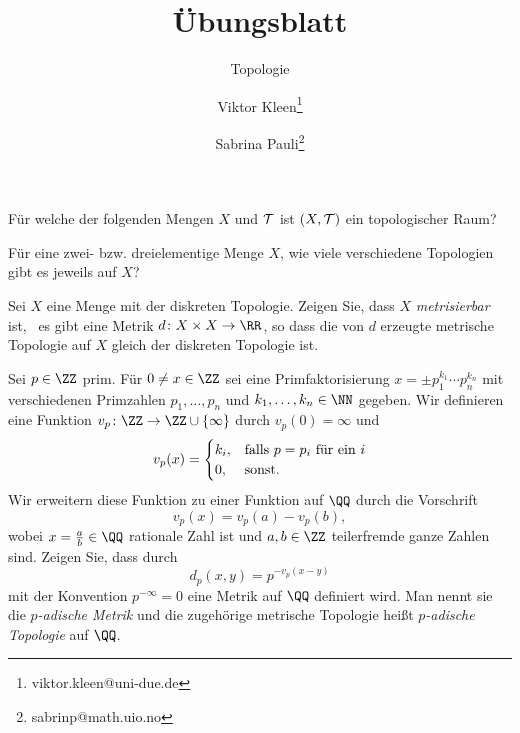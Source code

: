 

\setcounter{Sheet}{1}

\title{Übungsblatt \theSheet}
\subtitle{Topologie}
\author{Viktor Kleen\footnote{viktor.kleen@uni-due.de} \and Sabrina Pauli\footnote{sabrinp@math.uio.no}}
\date{}


\maketitle
\begin{exercise}
Für welche der folgenden Mengen \(X\) und \(\cal T\) ist \((X,\cal T)\)
ein topologischer Raum?
\end{exercise}

\begin{exercise}
Für eine zwei- bzw. dreielementige Menge \(X\), wie viele verschiedene
Topologien gibt es jeweils auf \(X\)?
\end{exercise}

\begin{exercise}
Sei \(X\) eine Menge mit der diskreten Topologie. Zeigen Sie, dass \(X\)
\emph{metrisierbar} ist, \ddh~es gibt eine Metrik \(d\colon X\times
X\to\RR\), so dass die von \(d\) erzeugte metrische Topologie auf \(X\)
gleich der diskreten Topologie ist.
\end{exercise}

\begin{exercise}
Sei \(p\in \ZZ\) prim. Für \(0\neq x\in\ZZ\) sei eine Primfaktorisierung
\(x = \pm p_1^{k_1}\cdots p_n^{k_n}\) mit verschiedenen Primzahlen
\(p_1,\dots,p_n\) und \(k_1,\dots,k_n\in\NN\) gegeben. Wir definieren
eine Funktion \(v_p\colon\ZZ\to\ZZ\cup\{\infty\}\) durch \(v_p(0) =
\infty\) und
\[
v_p(x) = \begin{cases}
k_i,& \textnormal{falls \(p = p_i\) für ein \(i\)} \\
0, &\textnormal{sonst.}
\end{cases}
\]
Wir erweitern diese Funktion zu einer Funktion auf \(\QQ\) durch die
Vorschrift
\[
v_p(x) = v_p(a) - v_p(b),
\]
wobei \(x = \tfrac{a}{b}\in\QQ\) rationale Zahl ist und \(a,b\in\ZZ\)
teilerfremde ganze Zahlen sind. Zeigen Sie, dass durch
\[
d_p(x,y) = p^{-v_p(x-y)}
\]
mit der Konvention \(p^{-\infty} = 0\) eine Metrik auf \(\QQ\) definiert
wird. Man nennt sie die \emph{\(p\)-adische Metrik} und die zugehörige
metrische Topologie heißt \emph{\(p\)-adische Topologie} auf \(\QQ\).
\end{exercise}

